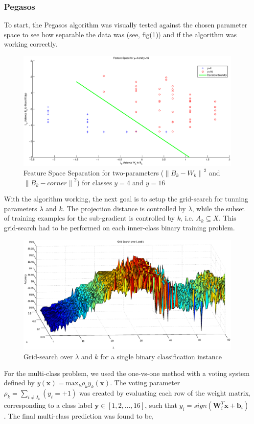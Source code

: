 \documentclass[fleqn]{article}
\begin{document}
\subsubsection{Pegasos}
\label{subsub:Pegasos}
To start, the Pegasos algorithm\cite{Shwartz:2007} was visually tested against the chosen parameter space to see how separable the data was (see, fig(\ref{fig:2D_Space})) and if the algorithm was working correctly.  
%
\begin{figure}[H]
	{\centering
		\includegraphics[trim = 10mm 8mm 10mm 0mm, clip,width=1.0\textwidth]{figs/2D_FeatureSpace}
		\caption{Feature Space Separation for two-parameters ($\left\|B_k - W_k\right\|^2$ and $\left\|B_k - corner\right\|^2$) for classes $y=4$ and $y=16$}
		\label{fig:2D_Space}
	}
\end{figure}
%
With the algorithm working, the next goal is to setup the grid-search for tunning parameters $\lambda$ and $k$.  The projection distance is controlled by $\lambda$, while the subset of training examples for the sub-gradient is controlled by $k$, i.e. $A_k \subseteq X$.  This grid-search had to be performed on each inner-class binary training problem. 
%
\begin{figure}[H]
	{\centering
		\includegraphics[trim = 10mm 8mm 10mm 0mm, clip,width=1.0\textwidth]{figs/Grid_Search}
		\caption{Grid-search over $\lambda$ and $k$ for a single binary classification instance}
		\label{fig:GridSearch}
	}
\end{figure}  
%
For the multi-class problem, we used the one-vs-one method with a voting system defined by $y(\mathbf{x}) = \text{max}_k \rho_k y_k (\mathbf{x})$.  The voting parameter $\rho_k = \sum_{i \neq I_k} (y_i = +1)$ was created by evaluating each row of the weight matrix, corresponding to a class label $\mathbf{y} \in [1,2,\dots,16]$, such that $y_i = sign(\mathbf{W}_i^T \mathbf{x} + \mathbf{b}_i)$.  The final multi-class prediction was found to be,
\end{document}
